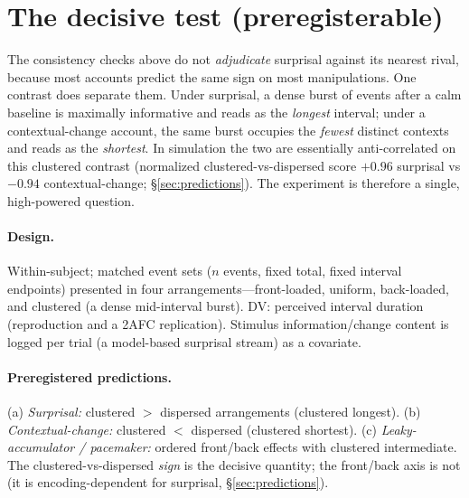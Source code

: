 \documentclass[11pt]{article}
\begin{document}
\section{The decisive test (preregisterable)}\label{sec:decisive}
The consistency checks above do not \emph{adjudicate} surprisal against its nearest rival,
because most accounts predict the same sign on most manipulations. One contrast does
separate them. Under surprisal, a dense burst of events after a calm baseline is maximally
informative and reads as the \emph{longest} interval; under a contextual-change account,
the same burst occupies the \emph{fewest} distinct contexts and reads as the
\emph{shortest}. In simulation the two are essentially anti-correlated on this clustered
contrast (normalized clustered-vs-dispersed score $+0.96$ surprisal vs $-0.94$
contextual-change; \S\ref{sec:predictions}). The experiment is therefore a single,
high-powered question.

\paragraph{Design.} Within-subject; matched event sets ($n$ events, fixed total, fixed
interval endpoints) presented in four arrangements---front-loaded, uniform, back-loaded,
and clustered (a dense mid-interval burst). DV: perceived interval duration (reproduction
and a 2AFC replication). Stimulus information/change content is logged per trial (a
model-based surprisal stream) as a covariate.

\paragraph{Preregistered predictions.} (a) \emph{Surprisal:} clustered $>$ dispersed
arrangements (clustered longest). (b) \emph{Contextual-change:} clustered $<$ dispersed
(clustered shortest). (c) \emph{Leaky-accumulator / pacemaker:} ordered front/back effects
with clustered intermediate. The clustered-vs-dispersed \emph{sign} is the decisive
quantity; the front/back axis is not (it is encoding-dependent for surprisal,
\S\ref{sec:predictions}).
\end{document}
